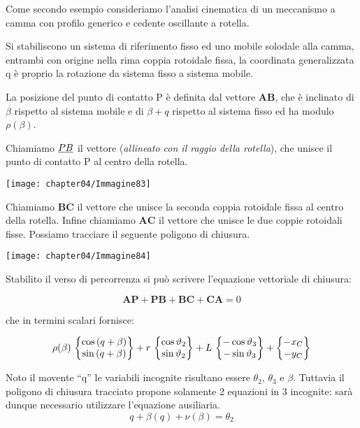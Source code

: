 		
\begin{minipage}{.5\textwidth}
		Come secondo esempio consideriamo l'analisi cinematica di un meccanismo a camma con profilo generico e cedente oscillante a rotella.
		
		Si stabiliscono un sistema di riferimento fisso ed uno mobile solodale alla camma, entrambi con origine nella rima coppia rotoidale fissa, la coordinata generalizzata q è proprio la rotazione da sistema fisso a sistema mobile.
		
		La posizione del punto di contatto P è definita dal vettore $\mathbf{AB}$, che è inclinato di $\beta$ rispetto al sistema mobile e di $\beta + q$ rispetto al sistema fisso ed ha modulo $\rho(\beta)$.
		
		Chiamiamo $\underline{PB}$ il vettore (\emph{allineato con il raggio della rotella}), che unisce il punto di contatto P al centro della rotella. 
		\end{minipage}
		\hfill
		\begin{minipage}{.5\textwidth}
		\centering
		\texttt{[image: chapter04/Immagine83]}
		\end{minipage}
		\vspace{2mm}
		
		Chiamiamo $\mathbf{BC}$ il vettore che unisce la seconda coppia rotoidale fissa al centro della rotella. Infine chiamiamo $\mathbf{AC}$ il vettore che unisce le due coppie rotoidali fisse.
		 Possiamo tracciare il seguente poligono di chiusura.
		\vspace{2mm}
		
		\begin{minipage}{0.5\textwidth}
		\centering
		\texttt{[image: chapter04/Immagine84]}
		\end{minipage}
		\hfill
		\begin{minipage}{0.5\textwidth}
		
		 Stabilito il verso di percorrenza si può scrivere l'equazione vettoriale di chiusura:
		
		\[\mathbf{AP}+\mathbf{PB}+\mathbf{BC}+\mathbf{CA} = 0\]
		
		che in termini scalari fornisce:
		
		\[
		\rho(\beta)\,\begin{Bmatrix}\cos{(q +\beta)}\\\sin{(q+\beta)}\end{Bmatrix} + r\,\begin{Bmatrix}\cos{\vartheta_2}\\\sin{\vartheta_2}\end{Bmatrix} + L\,\begin{Bmatrix}-\cos{\vartheta_3}\\-\sin{\vartheta_3}\end{Bmatrix} + \begin{Bmatrix}-x_C\\-y_C\end{Bmatrix}
		\]
		\end{minipage}
		\vspace{2mm}
		
		Noto il movente ``q'' le variabili incognite risultano essere $\theta_2$, $\theta_3$ e $\beta$. Tuttavia il poligono di chiusura tracciato propone solamente 2 equazioni in 3 incognite: sarà dunque necessario utilizzare l'equazione ausiliaria.
		\[
		q + \beta(q) + \nu(\beta) = \theta_2
		\]

	